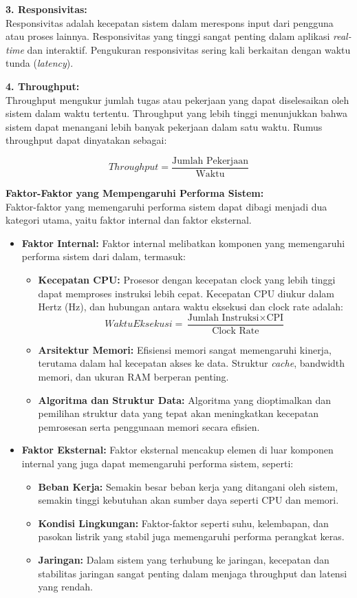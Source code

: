 \documentclass[12pt]{article}
\begin{document}
\textbf{3. Responsivitas:} \\
Responsivitas adalah kecepatan sistem dalam merespons input dari pengguna atau proses lainnya. Responsivitas yang tinggi sangat penting dalam aplikasi \textit{real-time} dan interaktif. Pengukuran responsivitas sering kali berkaitan dengan waktu tunda (\textit{latency}).

\textbf{4. Throughput:} \\
Throughput mengukur jumlah tugas atau pekerjaan yang dapat diselesaikan oleh sistem dalam waktu tertentu. Throughput yang lebih tinggi menunjukkan bahwa sistem dapat menangani lebih banyak pekerjaan dalam satu waktu. Rumus throughput dapat dinyatakan sebagai:

\[
Throughput = \frac{\text{Jumlah Pekerjaan}}{\text{Waktu}}
\]

\textbf{Faktor-Faktor yang Mempengaruhi Performa Sistem:} \\
Faktor-faktor yang memengaruhi performa sistem dapat dibagi menjadi dua kategori utama, yaitu faktor internal dan faktor eksternal.

\begin{itemize}
    \item \textbf{Faktor Internal:} Faktor internal melibatkan komponen yang memengaruhi performa sistem dari dalam, termasuk:
    \begin{itemize}
        \item \textbf{Kecepatan CPU:} Prosesor dengan kecepatan clock yang lebih tinggi dapat memproses instruksi lebih cepat. Kecepatan CPU diukur dalam Hertz (Hz), dan hubungan antara waktu eksekusi dan clock rate adalah:
        \[
        Waktu Eksekusi = \frac{\text{Jumlah Instruksi} \times \text{CPI}}{\text{Clock Rate}}
        \]
        \item \textbf{Arsitektur Memori:} Efisiensi memori sangat memengaruhi kinerja, terutama dalam hal kecepatan akses ke data. Struktur \textit{cache}, bandwidth memori, dan ukuran RAM berperan penting.
        \item \textbf{Algoritma dan Struktur Data:} Algoritma yang dioptimalkan dan pemilihan struktur data yang tepat akan meningkatkan kecepatan pemrosesan serta penggunaan memori secara efisien.
    \end{itemize}
    
    \item \textbf{Faktor Eksternal:} Faktor eksternal mencakup elemen di luar komponen internal yang juga dapat memengaruhi performa sistem, seperti:
    \begin{itemize}
        \item \textbf{Beban Kerja:} Semakin besar beban kerja yang ditangani oleh sistem, semakin tinggi kebutuhan akan sumber daya seperti CPU dan memori.
        \item \textbf{Kondisi Lingkungan:} Faktor-faktor seperti suhu, kelembapan, dan pasokan listrik yang stabil juga memengaruhi performa perangkat keras.
        \item \textbf{Jaringan:} Dalam sistem yang terhubung ke jaringan, kecepatan dan stabilitas jaringan sangat penting dalam menjaga throughput dan latensi yang rendah.
    \end{itemize}
\end{itemize}
\end{document}
